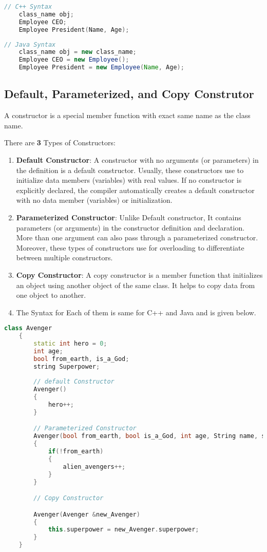 \documentclass[11pt]{article}
\begin{document}
\begin{lstlisting}[language = C++]
	// C++ Syntax
	class_name obj;
	Employee CEO;
	Employee President(Name, Age);
\end{lstlisting}

\begin{lstlisting}[language = java]
	// Java Syntax
	class_name obj = new class_name;
	Employee CEO = new Employee();
	Employee President = new Employee(Name, Age);
\end{lstlisting}

\subsection{Default, Parameterized, and Copy Construtor}
A constructor is a special member function with exact same name as the class name.

There are \textbf{3} Types of Constructors: 

\begin{enumerate}
	\item \textbf{Default Constructor}: A constructor with no arguments (or parameters) in the definition is a default constructor. Usually, these constructors use to initialize data members (variables) with real values. If no constructor is explicitly declared, the compiler automatically creates a default constructor with no data member (variables) or initialization.
	\item \textbf{Parameterized Constructor}: Unlike Default constructor, It contains parameters (or arguments) in the constructor definition and declaration. More than one argument can also pass through a parameterized constructor. Moreover, these types of constructors use for overloading to differentiate between multiple constructors.
	\item \textbf{Copy Constructor}: A copy constructor is a member function that initializes an object using another object of the same class. It helps to copy data from one object to another.
	\item The Syntax for Each of them is same for C++ and Java and is given below. 
\end{enumerate}

\begin{lstlisting}[language = C++]
	class Avenger
	{
		static int hero = 0;
		int age;
		bool from_earth, is_a_God;
		string Superpower;
		
		// default Constructor
		Avenger()
		{
			hero++;
		}

		// Parameterized Constructor
		Avenger(bool from_earth, bool is_a_God, int age, String name, string Superpower)
		{
			if(!from_earth)
			{
				alien_avengers++;
			}
		}

		// Copy Constructor

		Avenger(Avenger &new_Avenger)
		{
			this.superpower = new_Avenger.superpower;
		}
	}
\end{lstlisting}
\end{document}

